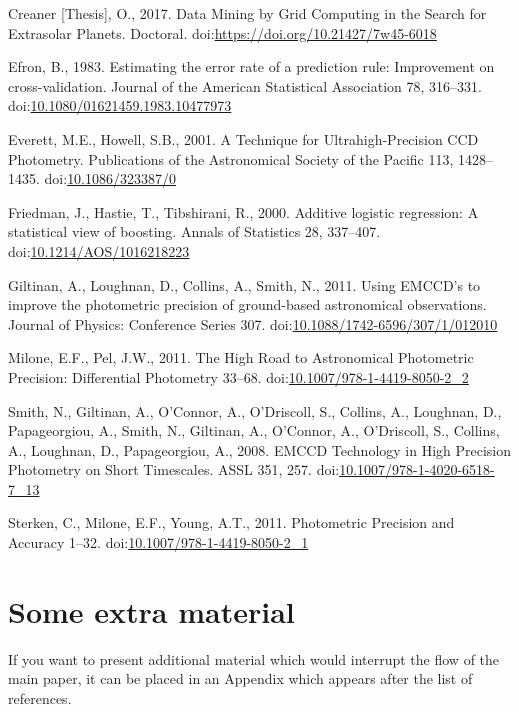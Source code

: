 \documentclass[]{elsarticle} %
\newlength{\cslhangindent}
\newlength{\cslentryspacingunit} %
\newenvironment{CSLReferences}[2] %
 {%
  \setlength{\parindent}{0pt}
  \ifodd #1
  \let\oldpar\par
  \def\par{\hangindent=\cslhangindent\oldpar}
  \fi
  \setlength{\parskip}{#2\cslentryspacingunit}
 }%
 {}
\begin{document}
\begin{CSLReferences}{1}{0}
\leavevmode{}%
Creaner {[}Thesis{]}, O., 2017. {Data Mining by Grid Computing in the
Search for Extrasolar Planets}. Doctoral.
doi:\url{https://doi.org/10.21427/7w45-6018}

\leavevmode{}%
Efron, B., 1983. {Estimating the error rate of a prediction rule:
Improvement on cross-validation}. Journal of the American Statistical
Association 78, 316--331.
doi:\href{https://doi.org/10.1080/01621459.1983.10477973}{10.1080/01621459.1983.10477973}

\leavevmode{}%
Everett, M.E., Howell, S.B., 2001. {A Technique for Ultrahigh‐Precision
CCD Photometry}. Publications of the Astronomical Society of the Pacific
113, 1428--1435.
doi:\href{https://doi.org/10.1086/323387/0}{10.1086/323387/0}

\leavevmode{}%
Friedman, J., Hastie, T., Tibshirani, R., 2000. {Additive logistic
regression: A statistical view of boosting}. Annals of Statistics 28,
337--407.
doi:\href{https://doi.org/10.1214/AOS/1016218223}{10.1214/AOS/1016218223}

\leavevmode{}%
Giltinan, A., Loughnan, D., Collins, A., Smith, N., 2011. {Using EMCCD's
to improve the photometric precision of ground-based astronomical
observations}. Journal of Physics: Conference Series 307.
doi:\href{https://doi.org/10.1088/1742-6596/307/1/012010}{10.1088/1742-6596/307/1/012010}

\leavevmode{}%
Milone, E.F., Pel, J.W., 2011. {The High Road to Astronomical
Photometric Precision: Differential Photometry} 33--68.
doi:\href{https://doi.org/10.1007/978-1-4419-8050-2_2}{10.1007/978-1-4419-8050-2\_2}

\leavevmode{}%
Smith, N., Giltinan, A., O'Connor, A., O'Driscoll, S., Collins, A.,
Loughnan, D., Papageorgiou, A., Smith, N., Giltinan, A., O'Connor, A.,
O'Driscoll, S., Collins, A., Loughnan, D., Papageorgiou, A., 2008.
{EMCCD Technology in High Precision Photometry on Short Timescales}.
ASSL 351, 257.
doi:\href{https://doi.org/10.1007/978-1-4020-6518-7_13}{10.1007/978-1-4020-6518-7\_13}

\leavevmode{}%
Sterken, C., Milone, E.F., Young, A.T., 2011. {Photometric Precision and
Accuracy} 1--32.
doi:\href{https://doi.org/10.1007/978-1-4419-8050-2_1}{10.1007/978-1-4419-8050-2\_1}

\end{CSLReferences}

\appendix

\hypertarget{some-extra-material}{%
\section{Some extra material}\label{some-extra-material}}

If you want to present additional material which would interrupt the
flow of the main paper, it can be placed in an Appendix which appears
after the list of references.
\end{document}
